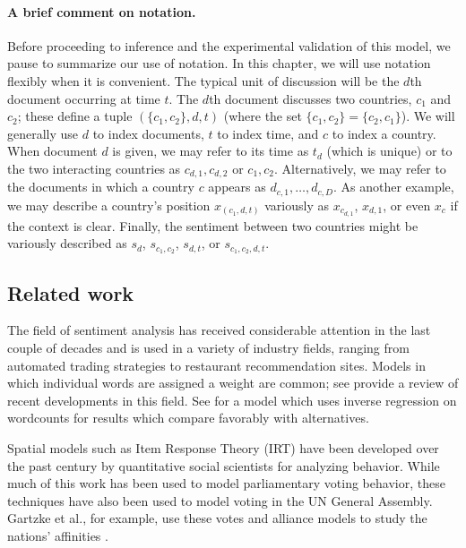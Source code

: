 \paragraph{A brief comment on notation.} Before proceeding to
inference and the experimental validation of this model, we pause to
summarize our use of notation.  In this chapter, we will use notation
flexibly when it is convenient.  The typical unit of discussion will
be the $d$th document occurring at time $t$.  The $d$th document
discusses two countries, $c_1$ and $c_2$; these define a tuple $(\{
c_1, c_2 \}, d, t)$ (where the set $\{ c_1, c_2 \} = \{ c_2, c_1 \}$).
We will generally use $d$ to index documents, $t$ to index time, and
$c$ to index a country.  When document $d$ is given, we may refer to
its time as $t_d$ (which is unique) or to the two interacting
countries as $c_{d,1},c_{d,2}$ or $c_1,c_2$.  Alternatively, we may
refer to the documents in which a country $c$ appears as $d_{c,1},
\ldots, d_{c,D}$.  As another example, we may describe a country's
position $x_{(c_1,d,t)}$ variously as $x_{c_{d,1}}$, $x_{d,1}$, or even $x_c$
if the context is clear. Finally, the sentiment between two countries
might be variously described as $s_d$, $s_{c_1,c_2}$, $s_{d,t}$, or
$s_{c_1,c_2,d,t}$.

\subsection{Related work}

The field of sentiment analysis has received considerable attention in
the last couple of decades and is used in a variety of industry
fields, ranging from automated trading strategies to restaurant
recommendation sites.  Models in which individual words are assigned a
weight are common; see \cite{pang:2008} provide a review of recent
developments in this field.  See \cite{taddy:2012} for a model which
uses inverse regression on wordcounts for results which compare
favorably with alternatives.

Spatial models such as Item Response Theory (IRT) have been developed
over the past century by quantitative social scientists for analyzing
behavior.  While much of this work has been used to model
parliamentary voting behavior, these techniques have also been used to
model voting in the UN General Assembly. Gartzke et al., for example,
use these votes and alliance models to study the nations' affinities
\citep{gartzke:1998}.

